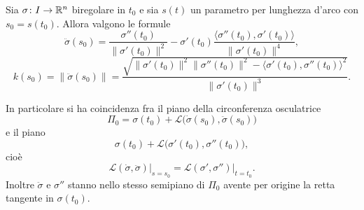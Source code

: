 \documentclass[a4paper]{article}
\begin{document}
\begin{snippettheorem}{}
Sia \(\sigma\colon I\to\mathbb{R}^n\) biregolare in \(t_0\) e sia \(s(t)\) un parametro per lunghezza d'arco con \(s_0=s(t_0)\). Allora valgono le formule
\[
     \ddot\sigma(s_0)
     = \frac{\sigma''(t_0)}{\|\sigma'(t_0)\|^2}
     - \sigma'(t_0)\frac{\langle\sigma''(t_0),\sigma'(t_0)\rangle}{\|\sigma'(t_0)\|^4},
\]
\[
     k(s_0)=\|\ddot\sigma(s_0)\|
     = \frac{\sqrt{\|\sigma'(t_0)\|^2\|\sigma''(t_0)\|^2-\langle\sigma'(t_0),\sigma''(t_0)\rangle^2}}{\|\sigma'(t_0)\|^3}.
\]

In particolare si ha coincidenza fra il piano della circonferenza osculatrice
\[
     \Pi_0=\sigma(t_0)+\mathcal L\bigl(\dot\sigma(s_0),\ddot\sigma(s_0)\bigr)
\]
e il piano
\[
     \sigma(t_0)+\mathcal L\bigl(\sigma'(t_0),\sigma''(t_0)\bigr),
\]
cioè
\[
     \mathcal L(\dot\sigma,\ddot\sigma)\big|_{s=s_0}
     =
     \mathcal L(\sigma',\sigma'')\big|_{t=t_0}.
\]
Inoltre \(\ddot\sigma\) e \(\sigma''\) stanno nello stesso semipiano di \(\Pi_0\) avente per origine la retta tangente in \(\sigma(t_0)\).
\end{snippettheorem}

\begin{center}
\end{center}

\pagebreak
\end{document}
